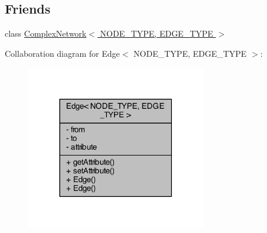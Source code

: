 \subsection*{Friends}
\begin{DoxyCompactItemize}
\item 
class \hyperlink{class_edge_ad8438fc5199b628ea294f77319026b6a}{Complex\+Network$<$ N\+O\+D\+E\+\_\+\+T\+Y\+P\+E, E\+D\+G\+E\+\_\+\+T\+Y\+P\+E $>$}
\end{DoxyCompactItemize}


Collaboration diagram for Edge$<$ N\+O\+D\+E\+\_\+\+T\+Y\+P\+E, E\+D\+G\+E\+\_\+\+T\+Y\+P\+E $>$\+:\nopagebreak
\begin{figure}[H]
\begin{center}
\leavevmode
\includegraphics[width=222pt]{class_edge__coll__graph}
\end{center}
\end{figure}


